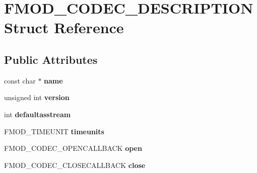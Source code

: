 \hypertarget{struct_f_m_o_d___c_o_d_e_c___d_e_s_c_r_i_p_t_i_o_n}{}\section{F\+M\+O\+D\+\_\+\+C\+O\+D\+E\+C\+\_\+\+D\+E\+S\+C\+R\+I\+P\+T\+I\+ON Struct Reference}
\label{struct_f_m_o_d___c_o_d_e_c___d_e_s_c_r_i_p_t_i_o_n}
\subsection*{Public Attributes}
\begin{DoxyCompactItemize}
\item 
const char $\ast$ {\bfseries name}\hypertarget{struct_f_m_o_d___c_o_d_e_c___d_e_s_c_r_i_p_t_i_o_n_a3d2d1cb50c8d3fcee03e465753a9adb0}{}\label{struct_f_m_o_d___c_o_d_e_c___d_e_s_c_r_i_p_t_i_o_n_a3d2d1cb50c8d3fcee03e465753a9adb0}

\item 
unsigned int {\bfseries version}\hypertarget{struct_f_m_o_d___c_o_d_e_c___d_e_s_c_r_i_p_t_i_o_n_a8dfb836ca79931ee6ca39c12bd8aad3f}{}\label{struct_f_m_o_d___c_o_d_e_c___d_e_s_c_r_i_p_t_i_o_n_a8dfb836ca79931ee6ca39c12bd8aad3f}

\item 
int {\bfseries defaultasstream}\hypertarget{struct_f_m_o_d___c_o_d_e_c___d_e_s_c_r_i_p_t_i_o_n_ac79461b38a89c34d2ec2e609736df941}{}\label{struct_f_m_o_d___c_o_d_e_c___d_e_s_c_r_i_p_t_i_o_n_ac79461b38a89c34d2ec2e609736df941}

\item 
F\+M\+O\+D\+\_\+\+T\+I\+M\+E\+U\+N\+IT {\bfseries timeunits}\hypertarget{struct_f_m_o_d___c_o_d_e_c___d_e_s_c_r_i_p_t_i_o_n_a17d05f38ea3ea759d20d463aa8a8ca9f}{}\label{struct_f_m_o_d___c_o_d_e_c___d_e_s_c_r_i_p_t_i_o_n_a17d05f38ea3ea759d20d463aa8a8ca9f}

\item 
F\+M\+O\+D\+\_\+\+C\+O\+D\+E\+C\+\_\+\+O\+P\+E\+N\+C\+A\+L\+L\+B\+A\+CK {\bfseries open}\hypertarget{struct_f_m_o_d___c_o_d_e_c___d_e_s_c_r_i_p_t_i_o_n_a6cd1d60659e4c2f1013f3b98924d51a7}{}\label{struct_f_m_o_d___c_o_d_e_c___d_e_s_c_r_i_p_t_i_o_n_a6cd1d60659e4c2f1013f3b98924d51a7}

\item 
F\+M\+O\+D\+\_\+\+C\+O\+D\+E\+C\+\_\+\+C\+L\+O\+S\+E\+C\+A\+L\+L\+B\+A\+CK {\bfseries close}\hypertarget{struct_f_m_o_d___c_o_d_e_c___d_e_s_c_r_i_p_t_i_o_n_aa628c3f28fd817bd36876fd845fd1df6}{}\label{struct_f_m_o_d___c_o_d_e_c___d_e_s_c_r_i_p_t_i_o_n_aa628c3f28fd817bd36876fd845fd1df6}


\end{DoxyCompactItemize}
